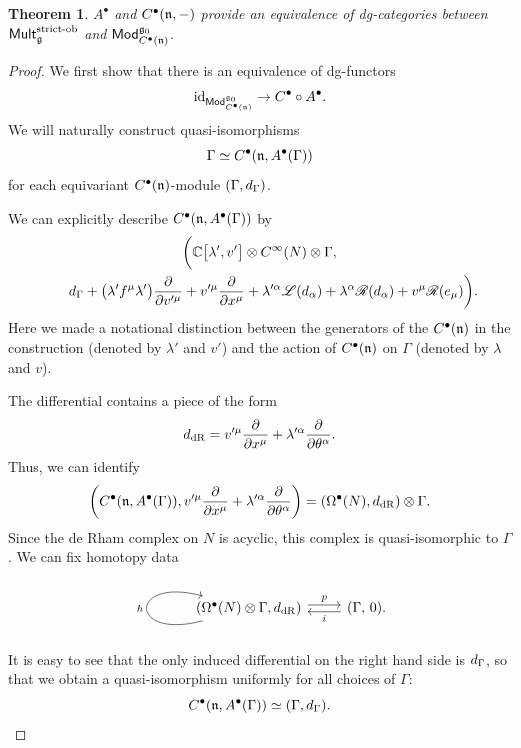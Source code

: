 \documentclass[11pt]{article}
\numberwithin{equation}{section}
\numberwithin{equation}{section}
\newtheorem{thm}{Theorem}[section]
\def\cat#1{\ensuremath{\mathsf{#1}}}
\DeclareMathOperator{\Mod}{\cat{Mod}}
\DeclareMathOperator{\Mult}{\cat{Mult}}
\def\bu{\bullet}
\def\d{{\rm d}}
\def\sL{\mathscr L}
\def\sR{\mathscr R}
\begin{document}
\begin{thm} \label{thm: equiv}
	$A^\bullet$ and $C^\bullet(\mathfrak n , - )$ provide an equivalence of dg-categories between $\Mult_\fg^{\text{\rm strict-ob}}$ and $\Mod^{\fg_0}_{C^\bullet({\fn})}$.
\end{thm}
\begin{proof}
	We first show that there is an equivalence of dg-functors
	\begin{equation*}
	\mathrm{id}_{\Mod^{\fg_0}_{C^\bullet({\fn})}} \to C^\bullet \circ A^\bullet .
	\end{equation*}
	We will naturally construct quasi-isomorphisms
	\begin{equation*}
	\Gamma \simeq C^\bu(\fn,A^\bu(\Gamma))
	\end{equation*}
	for each equivariant $C^\bu(\fn)$-module $(\Gamma,\d_\Gamma)$.
	
	We can explicitly describe $C^\bu(\fn,A^\bu(\Gamma))$ by
	\begin{gather*}
	\bigg( \CC\big[\lambda', v'\big] \otimes C^\infty(N) \otimes \Gamma ,\\
\qquad{}  \d_\Gamma + \big(\lambda' f^\mu \lambda'\big) \frac{\partial}{\partial v'^\mu} + v'^\mu \frac{\partial}{\partial x^\mu} + \lambda'^\alpha \sL(d_\alpha) + \lambda^\alpha \sR(d_\alpha) + v^\mu \sR(e_\mu) \bigg) .
	\end{gather*}
	Here we made a notational distinction between the generators of the $C^\bullet(\mathfrak n)$ in the construction (denoted by $\lambda'$ and $v'$) and the action of $C^\bullet(\mathfrak n)$ on $\Gamma$ (denoted by $\lambda$ and $v$).
	
	The differential contains a piece of the form
	\begin{equation*}
	\d_{\mathrm{dR}} = v'^\mu \frac{\partial}{\partial x^\mu} + \lambda'^\alpha \frac{\partial}{\partial \theta^\alpha} .
	\end{equation*}
	Thus, we can identify
	\begin{equation*}
	\left( C^\bu(\fn,A^\bu(\Gamma)) , v'^\mu \frac{\partial}{\partial x^\mu} + \lambda'^\alpha \frac{\partial}{\partial \theta^\alpha} \right) = \left( \Omega^\bu(N) , \d_{\mathrm{dR}} \right) \otimes \Gamma .
	\end{equation*}
	Since the de Rham complex on $N$ is acyclic, this complex is quasi-isomorphic to $\Gamma$. We can fix homotopy data
	\begin{equation*}
	\begin{tikzcd}
	\arrow[loop left]{l}{h} \left( \Omega^\bu(N) \otimes \Gamma , \d_{\mathrm{dR}} \right) \arrow[r, shift left, "p"] & (\Gamma , \, 0)\arrow[l, shift left, "i"] .
	\end{tikzcd}
	\end{equation*}
	It is easy to see that the only induced differential on the right hand side is $\d_\Gamma$, so that we obtain a quasi-isomorphism uniformly for all choices of $\Gamma$:
	\begin{equation*}
	C^\bu(\fn,A^\bu(\Gamma)) \simeq (\Gamma , \d_\Gamma) .
	\end{equation*}
	

\end{proof}
\end{document}
